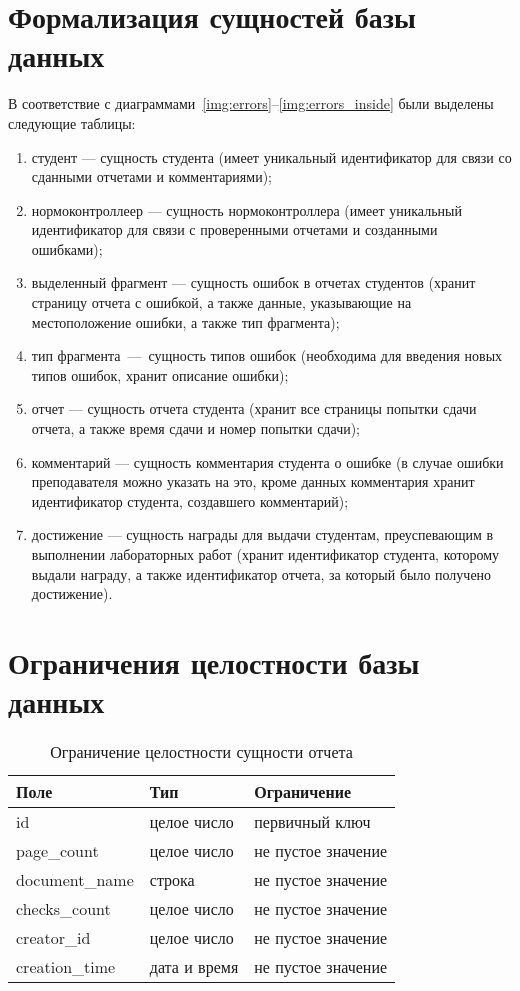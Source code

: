 \section{Формализация сущностей базы данных}

В соответствие с диаграммами~\ref{img:errors}--\ref{img:errors_inside} были выделены следующие таблицы:
\begin{enumerate}
	\item студент --- сущность студента (имеет уникальный идентификатор для связи со сданными отчетами и комментариями);
	\item нормоконтроллеер --- сущность нормоконтроллера (имеет уникальный идентификатор для связи с проверенными отчетами и созданными ошибками);
	\item выделенный фрагмент --- сущность ошибок в отчетах студентов (хранит страницу отчета с ошибкой, а также данные, указывающие на местоположение ошибки, а также тип фрагмента);
	\item тип фрагмента~---~сущность типов ошибок (необходима для введения новых типов ошибок, хранит описание ошибки);
	\item отчет --- сущность отчета студента (хранит все страницы попытки сдачи отчета, а также время сдачи и номер попытки сдачи);
	\item комментарий --- сущность комментария студента о ошибке (в случае ошибки преподавателя можно указать на это, кроме данных комментария хранит идентификатор студента, создавшего комментарий);
	\item достижение --- сущность награды для выдачи студентам, преуспевающим в выполнении лабораторных работ (хранит идентификатор студента, которому выдали награду, а также идентификатор отчета, за который было получено достижение).
\end{enumerate}

\section{Ограничения целостности базы данных}
\begin{table}[htbp]
	\centering
	\begin{tabularx}{\textwidth}{|X|X|X|}
		\hline
		Поле & Тип & Ограничение \\
		\hline
		id & целое число & первичный ключ \\
		\hline
		page\_count & целое число & не пустое значение\\
		\hline
		document\_name & строка & не пустое значение\\
		\hline
		checks\_count & целое число & не пустое значение\\
		\hline
		creator\_id & целое число & не пустое значение\\
		\hline
		creation\_time & дата и время & не пустое значение\\
		\hline
	\end{tabularx}
	\caption{Ограничение целостности сущности отчета}
	\label{t:documents_cons}
\end{table}

